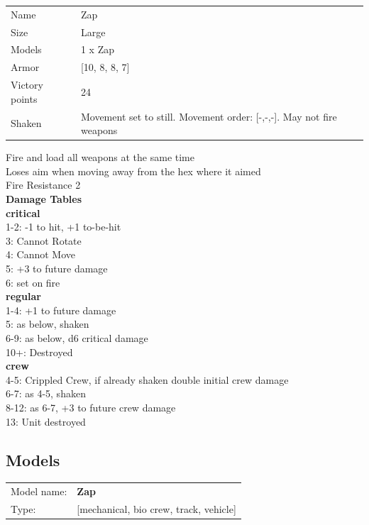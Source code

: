 \begin{tabular}{ll}
  Name & Zap \\
  Size & Large\\
  Models & 1 x Zap\\
  Armor & [10, 8, 8, 7]\\
  Victory points & 24\\
  Shaken & Movement set to still. Movement order: [-,-,-]. May not fire weapons\\
\end{tabular}

Fire and load all weapons at the same time\\ 
Loses aim when moving away from the hex where it aimed\\ 
Fire Resistance 2\\ 



{\bf Damage Tables} \\
 {\bf critical } \\
1-2: -1 to hit, +1 to-be-hit \\
3: Cannot Rotate \\
4: Cannot Move \\
5: +3 to future damage \\
6: set on fire \\
 {\bf regular } \\
1-4: +1 to future damage \\
5: as below, shaken \\
6-9: as below, d6 critical damage \\
10+: Destroyed \\
 {\bf crew } \\
4-5: Crippled Crew, if already shaken double initial crew damage \\
6-7: as 4-5, shaken \\
8-12: as 6-7, +3 to future crew damage \\
13: Unit destroyed \\


\clearpage

\subsection{ Models }

\begin{tabular}{ll}
Model name: & {\bf Zap } \\
Type: & [mechanical, bio crew, track, vehicle] \\
\end{tabular}

